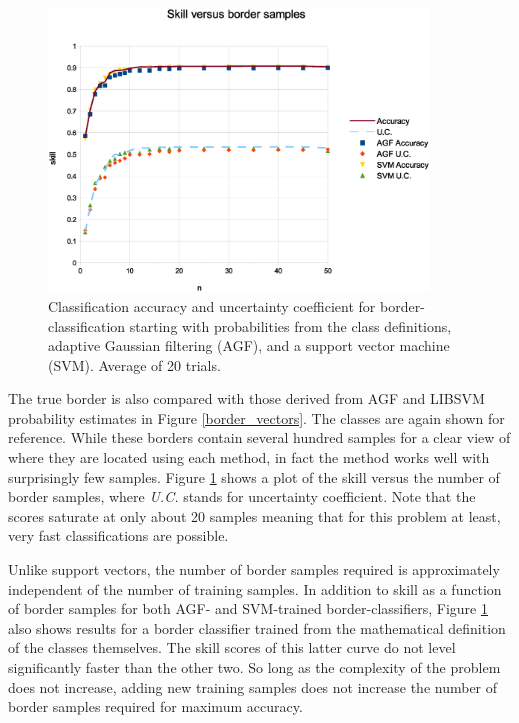 \begin{figure}
\includegraphics[width=0.9\textwidth]{skill_v_nb}
\caption{Classification accuracy and uncertainty coefficient for border-classification starting with probabilities from the class definitions, adaptive Gaussian filtering (AGF), and a support vector machine (SVM). Average of 20 trials.}
\label{skill_v_nb}
\end{figure}

The true border is also compared with those derived from AGF and LIBSVM
probability estimates in Figure \ref{border_vectors}.
The classes are again shown for reference.
While these borders contain several hundred samples for a clear view of where
they are located using each method, in fact the method works well with
surprisingly few samples.  Figure \ref{skill_v_nb} shows a plot of the skill
versus the number of border samples, where {\it U.C.} stands for
uncertainty coefficient. Note that the scores saturate at only about 20
samples meaning that for this problem at least, very fast classifications are
possible.

Unlike support vectors, the number of border samples required is approximately
independent of the number of training samples.
In addition to skill as a function of border samples for both AGF- and 
SVM-trained border-classifiers, Figure \ref{skill_v_nb} also shows results
for a border classifier trained from the mathematical definition of the 
classes themselves. 
The skill scores of this latter curve do not level significantly faster than 
the other two.
So long as the complexity of
the problem does not increase, adding new training samples does not increase
the number of border samples required for maximum accuracy.

